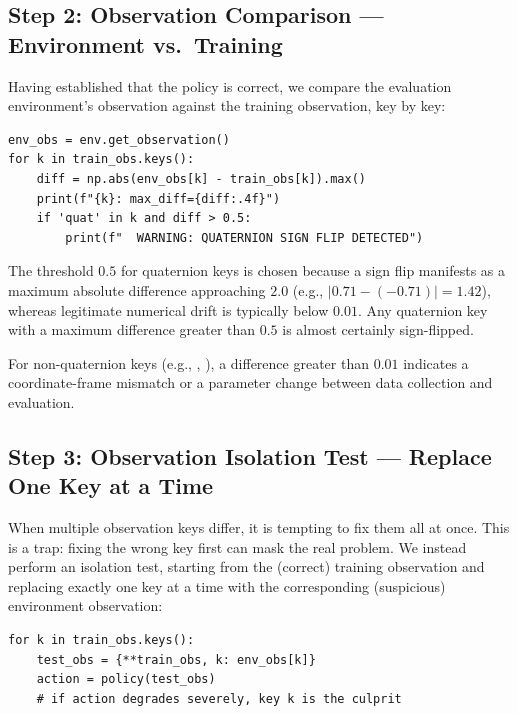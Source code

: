\subsection{Step 2: Observation Comparison --- Environment vs.\ Training}
\label{sec:methodology:obs_compare}

Having established that the policy is correct, we compare the evaluation environment's observation against the training observation, key by key:

\begin{lstlisting}[caption={Observation comparison: detect mismatches per key.}]
env_obs = env.get_observation()
for k in train_obs.keys():
    diff = np.abs(env_obs[k] - train_obs[k]).max()
    print(f"{k}: max_diff={diff:.4f}")
    if 'quat' in k and diff > 0.5:
        print(f"  WARNING: QUATERNION SIGN FLIP DETECTED")
\end{lstlisting}

The threshold $0.5$ for quaternion keys is chosen because a sign flip manifests as a maximum absolute difference approaching $2.0$ (e.g., $|0.71 - (-0.71)| = 1.42$), whereas legitimate numerical drift is typically below $0.01$. Any quaternion key with a maximum difference greater than $0.5$ is almost certainly sign-flipped.

For non-quaternion keys (e.g., , ), a difference greater than $0.01$ indicates a coordinate-frame mismatch or a parameter change between data collection and evaluation.

\subsection{Step 3: Observation Isolation Test --- Replace One Key at a Time}
\label{sec:methodology:isolation}

When multiple observation keys differ, it is tempting to fix them all at once. This is a trap: fixing the wrong key first can mask the real problem. We instead perform an isolation test, starting from the (correct) training observation and replacing exactly one key at a time with the corresponding (suspicious) environment observation:

\begin{lstlisting}[caption={Isolation test: identify the single key responsible for failure.}]
for k in train_obs.keys():
    test_obs = {**train_obs, k: env_obs[k]}
    action = policy(test_obs)
    # if action degrades severely, key k is the culprit
\end{lstlisting}

